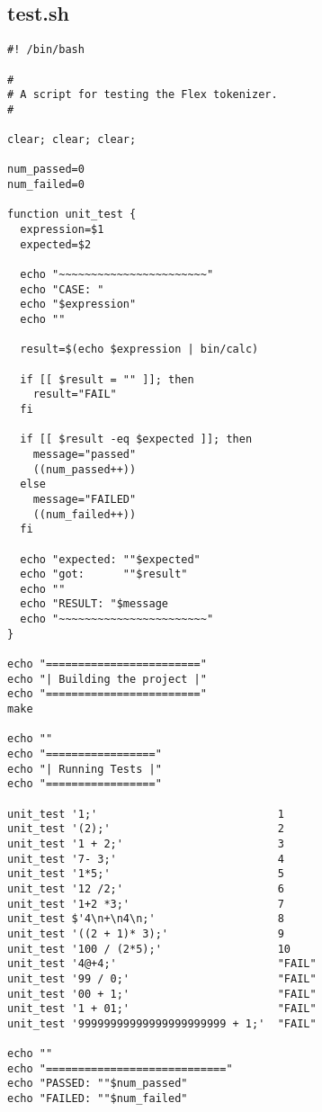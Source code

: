 \documentclass{article}
\begin{document}
\subsection{test.sh}
\begin{verbatim}
#! /bin/bash

#
# A script for testing the Flex tokenizer.
#

clear; clear; clear;

num_passed=0
num_failed=0

function unit_test {
  expression=$1
  expected=$2

  echo "~~~~~~~~~~~~~~~~~~~~~~~"
  echo "CASE: "
  echo "$expression"
  echo ""

  result=$(echo $expression | bin/calc)

  if [[ $result = "" ]]; then
    result="FAIL"
  fi

  if [[ $result -eq $expected ]]; then
    message="passed"
    ((num_passed++))
  else
    message="FAILED"
    ((num_failed++))
  fi

  echo "expected: ""$expected"
  echo "got:      ""$result"
  echo ""
  echo "RESULT: "$message
  echo "~~~~~~~~~~~~~~~~~~~~~~~"
}

echo "========================"
echo "| Building the project |"
echo "========================"
make

echo ""
echo "================="
echo "| Running Tests |"
echo "================="

unit_test '1;'                            1
unit_test '(2);'                          2
unit_test '1 + 2;'                        3
unit_test '7- 3;'                         4
unit_test '1*5;'                          5
unit_test '12 /2;'                        6
unit_test '1+2 *3;'                       7
unit_test $'4\n+\n4\n;'                   8 
unit_test '((2 + 1)* 3);'                 9
unit_test '100 / (2*5);'                  10
unit_test '4@+4;'                         "FAIL"
unit_test '99 / 0;'                       "FAIL"
unit_test '00 + 1;'                       "FAIL"
unit_test '1 + 01;'                       "FAIL"
unit_test '99999999999999999999999 + 1;'  "FAIL"

echo ""
echo "============================"
echo "PASSED: ""$num_passed"
echo "FAILED: ""$num_failed"

\end{verbatim}
\end{document}
